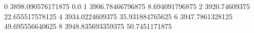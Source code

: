 0 3898.090576171875 0.0
1 3906.78466796875 8.694091796875
2 3920.74609375 22.655517578125
4 3934.0224609375 35.931884765625
6 3947.7861328125 49.695556640625
8 3948.835693359375 50.7451171875
